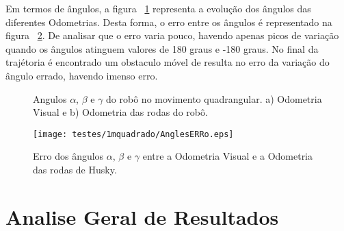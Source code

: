 Em termos de ângulos, a figura ~\ref{fig:ang1mquadrado} representa a evolução dos ângulos das diferentes Odometrias. Desta forma, o erro entre os ângulos é representado na figura ~\ref{fig:anglesERROquad}. De analisar que o erro varia pouco, havendo apenas picos de variação quando os ângulos atinguem valores de 180 graus e -180 graus. No final da trajétoria é encontrado um obstaculo móvel de resulta no erro da variação do ângulo errado, havendo imenso erro. 


\begin{figure}[h!]
	\centering
	\qquad
	\caption{Angulos $\alpha$, $\beta$ e $\gamma$ do robô  no movimento quadrangular. a) Odometria Visual e b) Odometria das rodas do robô.}
	\label{fig:ang1mquadrado}
\end{figure}

\begin{figure}[h!]
	\begin{center}
		\leavevmode		
		\texttt{[image: testes/1mquadrado/AnglesERRo.eps]}
		\caption{Erro dos ângulos $\alpha$, $\beta$ e $\gamma$ entre a Odometria Visual e a Odometria das rodas de Husky.}
		\label{fig:anglesERROquad}
	\end{center}
\end{figure}





\section{Analise Geral de Resultados}